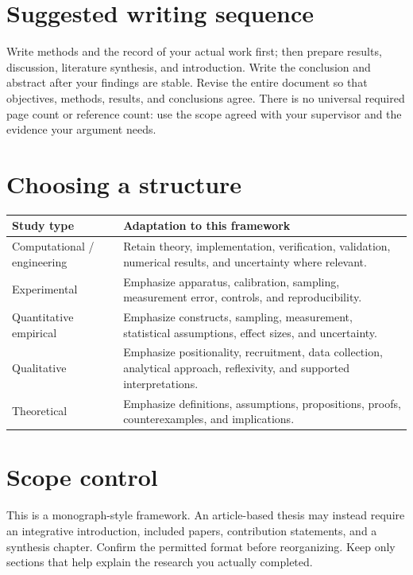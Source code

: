 \documentclass[12pt,a4paper,oneside]{report}
\newif\ifshowguidance
\newif\ifincludeapproval
\newcommand{\Guide}[1]{%
  \ifshowguidance
  \begin{tcolorbox}[enhanced,breakable,colback=GuideBlue,
    colframe=GuideBorder,boxrule=0.5pt,arc=1mm,
    title={Writing guide --- replace with your research},
    colbacktitle=ThesisBlue,coltitle=white,fonttitle=\small\bfseries,
    before skip=10pt,after skip=10pt]
    \small #1
  \end{tcolorbox}
  \fi}
\newcommand{\Draft}[1]{\par\noindent\textit{[TO WRITE: #1]}\par}
\newcommand{\FrontChapter}[1]{%
  \chapter*{#1}\phantomsection\addcontentsline{toc}{chapter}{#1}%
  \markboth{#1}{#1}}
\begin{document}
\section*{Suggested writing sequence}
Write methods and the record of your actual work first; then prepare results,
discussion, literature synthesis, and introduction. Write the conclusion and
abstract after your findings are stable. Revise the entire document so that
objectives, methods, results, and conclusions agree. There is no universal
required page count or reference count: use the scope agreed with your
supervisor and the evidence your argument needs.

\section*{Choosing a structure}
\noindent\begin{tabularx}{\textwidth}{@{}p{}Y@{}}
\toprule
Study type & Adaptation to this framework\\
\midrule
Computational / engineering & Retain theory, implementation, verification,
validation, numerical results, and uncertainty where relevant.\\
Experimental & Emphasize apparatus, calibration, sampling, measurement error,
controls, and reproducibility.\\
Quantitative empirical & Emphasize constructs, sampling, measurement,
statistical assumptions, effect sizes, and uncertainty.\\
Qualitative & Emphasize positionality, recruitment, data collection,
analytical approach, reflexivity, and supported interpretations.\\
Theoretical & Emphasize definitions, assumptions, propositions, proofs,
counterexamples, and implications.\\
\bottomrule
\end{tabularx}

\section*{Scope control}
This is a monograph-style framework. An article-based thesis may instead
require an integrative introduction, included papers, contribution statements,
and a synthesis chapter. Confirm the permitted format before reorganizing.
Keep only sections that help explain the research you actually completed.
\clearpage
\fi

\ifincludeapproval
\FrontChapter{Approval Page}
\Guide{Use the exact institutional approval/certification form. List the
committee, degree, defense date, and signatures only if required. Do not
insert simulated signatures or imply approval that has not occurred.}
\Draft{Insert the official approval page or approved wording.}
\fi
\end{document}
